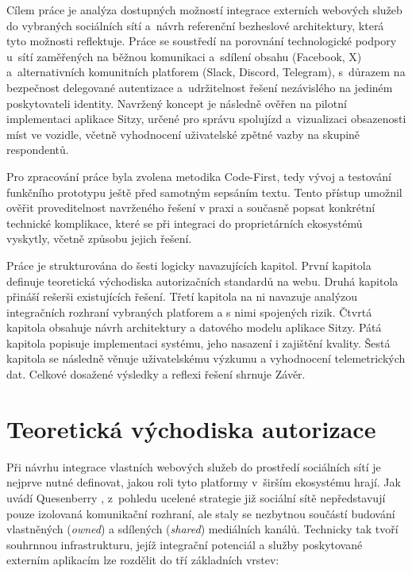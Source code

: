 \documentclass[male,czech,api_bc]{kitheses}
\begin{document}
Cílem práce je analýza dostupných možností integrace externích webových služeb do vybraných sociálních sítí a~návrh referenční bezheslové architektury, která tyto možnosti reflektuje. Práce se soustředí na porovnání technologické podpory u~sítí zaměřených na běžnou komunikaci a~sdílení obsahu (Facebook, X) a~alternativních komunitních platforem (Slack, Discord, Telegram), s~důrazem na bezpečnost delegované autentizace a~udržitelnost řešení nezávislého na jediném poskytovateli identity. Navržený koncept je následně ověřen na pilotní implementaci aplikace Sitzy, určené pro správu spolujízd a~vizualizaci obsazenosti míst ve vozidle, včetně vyhodnocení uživatelské zpětné vazby na skupině respondentů.

Pro zpracování práce byla zvolena metodika Code-First, tedy vývoj a testování funkčního prototypu ještě před samotným sepsáním textu. Tento přístup umožnil ověřit proveditelnost navrženého řešení v praxi a současně popsat konkrétní technické komplikace, které se při integraci do proprietárních ekosystémů vyskytly, včetně způsobu jejich řešení.

Práce je strukturována do šesti logicky navazujících kapitol. První kapitola definuje teoretická východiska autorizačních standardů na webu. Druhá kapitola přináší rešerši existujících řešení. Třetí kapitola na ni navazuje analýzou integračních rozhraní vybraných platforem a s nimi spojených rizik. Čtvrtá kapitola obsahuje návrh architektury a datového modelu aplikace Sitzy. Pátá kapitola popisuje implementaci systému, jeho nasazení i zajištění kvality. Šestá kapitola se následně věnuje uživatelskému výzkumu a vyhodnocení telemetrických dat. Celkové dosažené výsledky a reflexi řešení shrnuje Závěr.

\chapter{Teoretická východiska autorizace}

Při návrhu integrace vlastních webových služeb do prostředí sociálních sítí je nejprve nutné definovat, jakou roli tyto platformy v~širším ekosystému hrají. Jak uvádí Quesenberry \cite{Quesenberry2024}, z~pohledu ucelené strategie již sociální sítě nepředstavují pouze izolovaná komunikační rozhraní, ale staly se nezbytnou součástí budování vlastněných (\textit{owned}) a sdílených (\textit{shared}) mediálních kanálů. Technicky tak tvoří souhrnnou infrastrukturu, jejíž integrační potenciál a služby poskytované externím aplikacím lze rozdělit do tří základních vrstev:
\end{document}
